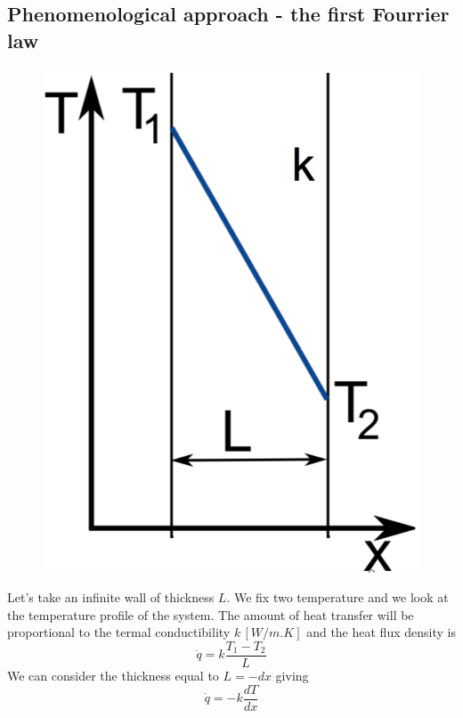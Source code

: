  		\subsection{Phenomenological approach - the first Fourrier law}
 			\begin{figure}
 			\vspace{-5mm}
 			\includegraphics[scale=0.2]{ch3/4}
 			\end{figure}
 			Let's take an infinite wall of thickness $L$. We fix two temperature and we look at the temperature profile of the system. The amount of heat transfer will be proportional to the termal conductibility $k \, [W/m.K]$  and the heat flux density is 
 			\begin{equation}
 				\dot{q} = k \frac{T_1-T_2}{L}
 			\end{equation}
 			We can consider the thickness equal to $L = -dx$ giving
 			\begin{equation}
 				\dot{q} = -k\frac{dT}{dx}
 			\end{equation}
 			
